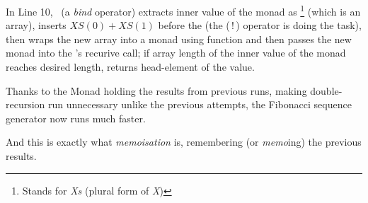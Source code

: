 In Line 10, \basicmbind\ (a \emph{bind} operator) extracts inner value of the monad  as \footnote{Stands for \emph{Xs} (plural form of \emph{X})} (which is an array), inserts $XS(0) + XS(1)$ before the  (the (\,!\,) operator is doing the task), then wraps the new array into a monad using  function and then passes the new monad into the 's recurive call; if array length of the inner value of the monad reaches desired length, returns head-element of the value.

Thanks to the Monad holding the results from previous runs, making double-recursion run unnecessary unlike the previous attempts, the Fibonacci sequence generator now runs much faster.

And this is exactly what \emph{memoisation} is, remembering (or \emph{memo}ing) the previous results.
